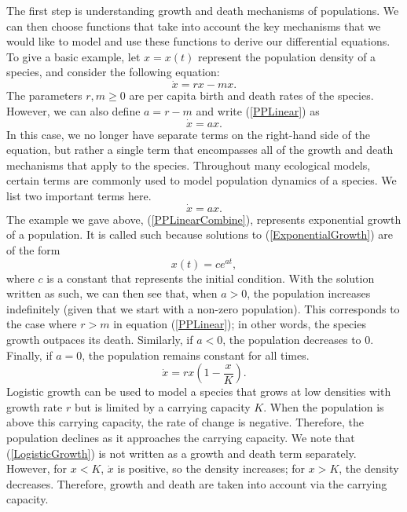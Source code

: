 \documentclass[12pt]{UOthesis}
\theoremstyle{remarkstyle}
\begin{document}
The first step is understanding growth and death mechanisms of populations. We can then choose functions that take into account the key mechanisms that we would like to model and use these functions to derive our differential equations. To give a basic example, let $x=x(t)$ represent the population density of a species, and consider the following equation:
\begin{equation}
	\dot{x}=rx-mx.
	\label{PPLinear}
\end{equation}
The parameters $r,m\ge 0$ are per capita birth and death rates of the species. However, we can also define $a=r-m$ and write (\ref{PPLinear}) as
\begin{equation}
	\dot{x}=ax.
	\label{PPLinearCombine}
\end{equation}
In this case, we no longer have separate terms on the right-hand side of the equation, but rather a single term that encompasses all of the growth and death mechanisms that apply to the species. Throughout many ecological models, certain terms are commonly used to model population dynamics of a species. We list two important terms here.\\

\begin{equation}
	\dot{x}=ax.
	\label{ExponentialGrowth}
\end{equation}
The example we gave above, (\ref{PPLinearCombine}), represents exponential growth of a population. It is called such because solutions to (\ref{ExponentialGrowth}) are of the form
$$x(t)=ce^{at},$$
where $c$ is a constant that represents the initial condition. With the solution written as such, we can then see that, when $a>0$, the population increases indefinitely (given that we start with a non-zero population). This corresponds to the case where $r>m$ in equation (\ref{PPLinear}); in other words, the species growth outpaces its death. Similarly, if $a<0$, the population decreases to 0. Finally, if $a=0$, the population remains constant for all times.\\

\begin{equation}
	\dot{x}=rx\left(1-\frac{x}{K}\right).
	\label{LogisticGrowth}
\end{equation}
Logistic growth can be used to model a species that grows at low densities with growth rate $r$ but is limited by a carrying capacity $K$. When the population is above this carrying capacity, the rate of change is negative. Therefore, the population declines as it approaches the carrying capacity. We note that (\ref{LogisticGrowth}) is not written as a growth and death term separately. However, for $x<K$, $\dot{x}$ is positive, so the density increases; for $x>K$, the density decreases. Therefore, growth and death are taken into account via the carrying capacity.\\
\end{document}
